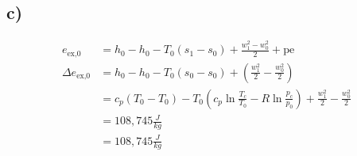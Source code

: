

\subsection*{c)}

\begin{align*}
e_{\text{ex,0}} &= h_0 - h_0 - T_0 (s_1 - s_0) + \frac{w_1^2 - w_0^2}{2} + \text{pe} \\
\Delta e_{\text{ex,0}} &= h_0 - h_0 - T_0 (s_0 - s_0) + \left( \frac{w_1^2}{2} - \frac{w_0^2}{2} \right) \\
&= c_p (T_0 - T_0) - T_0 \left( c_p \ln \frac{T_c}{T_0} - R \ln \frac{p_c}{p_0} \right) + \frac{w_1^2}{2} - \frac{w_0^2}{2} \\
&= 108,745 \frac{J}{kg} \\
&= 108,745 \frac{J}{kg}
\end{align*}